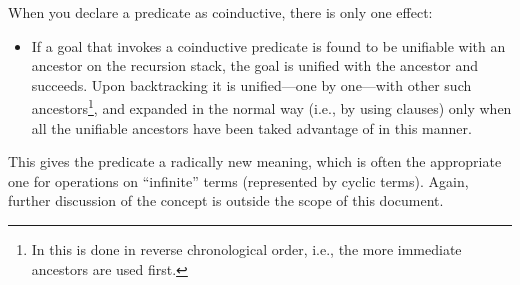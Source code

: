 
When you declare a predicate as coinductive,
there is only one effect:
\begin{itemize}
  \item
    If a goal that invokes a coinductive predicate is found to be unifiable
    with an ancestor on the recursion stack, the goal is unified with the
    ancestor and succeeds.  Upon backtracking it is unified---one by
    one---with other such ancestors\footnote{
      In  this is done in reverse chronological order, i.e.,
      the more immediate ancestors are used first.
    }, and expanded in the normal way (i.e., by
    using clauses) only when all the unifiable ancestors have been taked
    advantage of in this manner.
\end{itemize}
This gives the predicate a radically new meaning, which is often the
appropriate one for operations on ``infinite'' terms (represented by cyclic
terms).  Again, further discussion of the concept is outside the scope of
this document.
